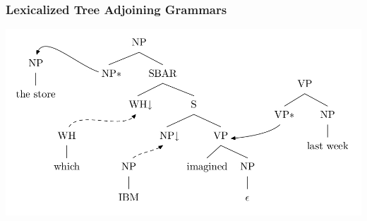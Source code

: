 \documentclass[compress,color=usenames]{beamer}
\begin{document}
\begin{frame}
\frametitle{Lexicalized Tree Adjoining Grammars}

\begin{center}
\includegraphics[scale=.4]{pics/pic2-8.jpg}
\end{center}


\end{frame}
\end{document}
